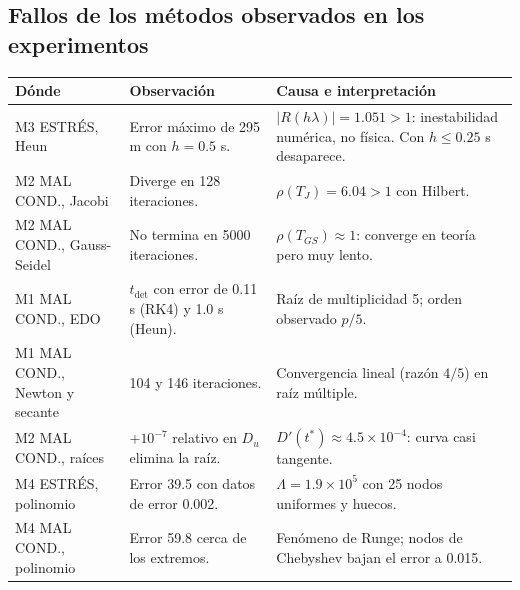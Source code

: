 \documentclass[11pt,letterpaper]{article}
\begin{document}
\subsection{Fallos de los métodos observados en los experimentos}
{\small
\begin{longtable}{p{3.2cm}p{5.6cm}p{6.4cm}}
\toprule
\textbf{Dónde} & \textbf{Observación} & \textbf{Causa e interpretación}\\
\midrule
M3 ESTRÉS, Heun & Error máximo de 295 m con $h=0.5$ s. & $|R(h\lambda)|=1.051>1$: inestabilidad numérica, no física. Con $h\le0.25$ s desaparece.\\
M2 MAL COND., Jacobi & Diverge en 128 iteraciones. & $\rho(T_J)=6.04>1$ con Hilbert.\\
M2 MAL COND., Gauss-Seidel & No termina en 5000 iteraciones. & $\rho(T_{GS})\approx1$: converge en teoría pero muy lento.\\
M1 MAL COND., EDO & $t_{\mathrm{det}}$ con error de 0.11 s (RK4) y 1.0 s (Heun). & Raíz de multiplicidad 5; orden observado $p/5$.\\
M1 MAL COND., Newton y secante & 104 y 146 iteraciones. & Convergencia lineal (razón $4/5$) en raíz múltiple.\\
M2 MAL COND., raíces & $+10^{-7}$ relativo en $D_u$ elimina la raíz. & $D'(t^*)\approx4.5\times10^{-4}$: curva casi tangente.\\
M4 ESTRÉS, polinomio & Error 39.5 con datos de error 0.002. & $\Lambda=1.9\times10^5$ con 25 nodos uniformes y huecos.\\
M4 MAL COND., polinomio & Error 59.8 cerca de los extremos. & Fenómeno de Runge; nodos de Chebyshev bajan el error a 0.015.\\
\bottomrule
\end{longtable}}
\end{document}
